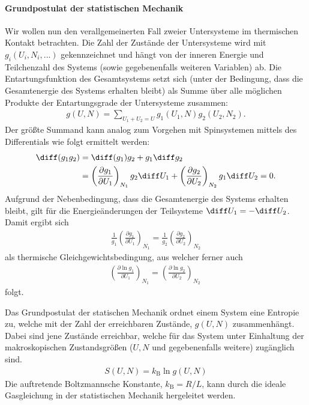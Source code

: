 \paragraph*{Grundpostulat der statistischen Mechanik}
Wir wollen nun den verallgemeinerten Fall zweier Untersysteme im thermischen Kontakt betrachten. Die Zahl der Zustände der Untersysteme wird mit $g_i(U_i,N_i,...)$ gekennzeichnet und hängt von der inneren Energie und Teilchenzahl des Systems (sowie gegebenenfalls weiteren Variablen) ab. Die Entartungsfunktion des Gesamtsystems setzt sich (unter der Bedingung, dass die Gesamtenergie des Systems erhalten bleibt) als Summe über alle möglichen Produkte der Entartungsgrade der Untersysteme zusammen: 
\begin{align*}
    g(U,N)=\sum_{U_1+U_2=U}g_1(U_1,N)g_2(U_2,N_2).
\end{align*}
Der größte Summand kann analog zum Vorgehen mit Spinsystemen mittels des Differentials wie folgt ermittelt werden:
\begin{align*}
    \diff(g_1g_2)&=\diff(g_1)g_2+g_1\diff g_2\\
    &=\left(\frac{\partial g_1}{\partial U_1}\right)_{N_1}g_2\diff U_1+\left(\frac{\partial g_2}{\partial U_2}\right)_{N_2}g_1\diff U_2=0.
\end{align*}
Aufgrund der Nebenbedingung, dass die Gesamtenergie des Systems erhalten bleibt, gilt für die Energieänderungen der Teilsysteme $\diff U_1=-\diff U_2$.
Damit ergibt sich 
\begin{align*}
    \frac{1}{g_1}\left(\frac{\partial g_1}{\partial U_1}\right)_{N_1}=\frac{1}{g_2}\left(\frac{\partial g_2}{\partial U_2}\right)_{N_2}
\end{align*}
als thermische Gleichgewichtsbedingung, aus welcher ferner auch
\begin{align*}
    \boxed{\left(\frac{\partial \ln g_1}{\partial U_1}\right)_{N_1}=\left(\frac{\partial \ln g_2}{\partial U_2}\right)_{N_2}}\:
\end{align*}
folgt.
\begin{postulate}
    \label{post:GrundpostulatStatMech}
     Das Grundpostulat der statischen Mechanik ordnet einem System eine Entropie zu, welche mit der Zahl der erreichbaren Zustände, $g(U,N)$ zusammenhängt. Dabei sind jene Zustände erreichbar, welche für das System unter Einhaltung der makroskopischen Zustandsgrößen ($U,N$ und gegebenenfalls weitere) zugänglich sind.
    \begin{align*}
        \boxed{S(U,N)=k_\mathrm{B}\ln g(U,N)}
    \end{align*}
    Die auftretende Boltzmannsche Konstante, $k_\mathrm{B}=R/L$, kann durch die ideale Gasgleichung in der statistischen Mechanik hergeleitet werden.
\end{postulate}
